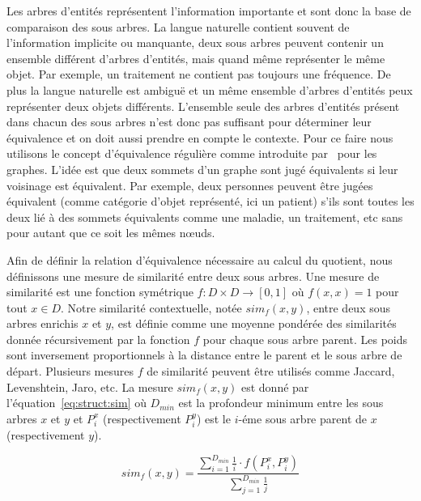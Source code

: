 Les arbres d'entités représentent l'information importante et sont donc la base de comparaison des sous arbres.
La langue naturelle contient souvent de l'information implicite ou manquante, deux sous arbres peuvent contenir un ensemble différent d'arbres d'entités, mais quand même représenter le même objet.
Par exemple, un traitement ne contient pas toujours une fréquence.
De plus la langue naturelle est ambiguë et un même ensemble d'arbres d'entités peux représenter deux objets différents.
L'ensemble seule des arbres d'entités présent dans chacun des sous arbres n'est donc pas suffisant pour déterminer leur équivalence et on doit aussi prendre en compte le contexte.
Pour ce faire nous utilisons le concept d'équivalence régulière comme introduite par~\cite{whiteGraphSemigroupHomomorphisms1983} pour les graphes.
L'idée est que deux sommets d'un graphe sont jugé équivalents si leur voisinage est équivalent.
Par exemple, deux personnes peuvent être jugées équivalent (comme catégorie d'objet représenté, ici un patient) s'ils sont toutes les deux lié à des sommets équivalents comme une maladie, un traitement, etc sans pour autant que ce soit les mêmes nœuds.

Afin de définir la relation d'équivalence nécessaire au calcul du quotient, nous définissons une mesure de similarité entre deux sous arbres.
Une mesure de similarité est une fonction symétrique $f : D \times D \to [0,1]$ où $f(x, x) = 1$ pour tout $x \in D$.
Notre similarité contextuelle, notée $sim_f(x, y)$, entre deux sous arbres enrichis $x$ et $y$, est définie comme une moyenne pondérée des similarités donnée récursivement par la fonction $f$ pour chaque sous arbre parent.
Les poids sont inversement proportionnels à la distance entre le parent et le sous arbre de départ.
Plusieurs mesures $f$ de similarité peuvent être utilisés comme Jaccard, Levenshtein, Jaro, etc.
La mesure $sim_f(x, y)$ est donné par l'équation~\ref{eq:struct:sim} où $D_{min}$ est la profondeur minimum entre les sous arbres $x$ et $y$ et $P^x_i$ (respectivement $P^y_i$) est le $i$-éme sous arbre parent de $x$ (respectivement $y$).

\begin{equation}
    sim_f(x, y) = \frac{\sum_{i=1}^{D_{min}} \frac{1}{i} \cdot f(P^x_i, P^y_i)}{\sum_{j=1}^{D_{min}} \frac{1}{j}} \label{eq:struct:sim}
\end{equation}

